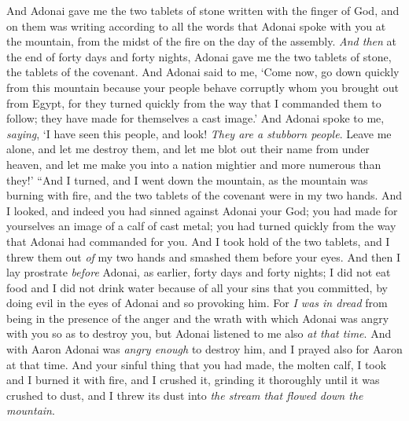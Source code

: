 \begin{biblechapter}
\verse And Adonai gave me the two tablets of stone written with the finger of God, and on them was writing according to all the words that Adonai spoke with you at the mountain, from the midst of the fire on the day of the assembly.
\verse \textit{And then} at the end of forty days and forty nights, Adonai gave me the two tablets of stone, the tablets of the covenant.
\verse And Adonai said to me, ‘Come now, go down quickly from this mountain because your people behave corruptly whom you brought out from Egypt, for they turned quickly from the way that I commanded them to follow; they have made for themselves a cast image.’
\verse And Adonai spoke to me, \textit{saying}, ‘I have seen this people, and look! \textit{They are a stubborn people}.
\verse Leave me alone, and let me destroy them, and let me blot out their name from under heaven, and let me make you into a nation mightier and more numerous than they!’
\verse “And I turned, and I went down the mountain, as the mountain was burning with fire, and the two tablets of the covenant were in my two hands.
\verse And I looked, and indeed you had sinned against Adonai your God; you had made for yourselves an image of a calf of cast metal;  you had turned quickly from the way that Adonai had commanded for you.
\verse And I took hold of the two tablets, and I threw them out \textit{of} my two hands and smashed them before your eyes.
\verse And then I lay prostrate \textit{before} Adonai, as earlier, forty days and forty nights; I did not eat food and I did not drink water because of all your sins that you committed, by doing evil in the eyes of Adonai and so provoking him.
\verse For \textit{I was in dread} from being in the presence of the anger and the wrath with which Adonai was angry with you so as to destroy you, but Adonai listened to me also \textit{at that time}.
\verse And with Aaron Adonai was \textit{angry enough} to destroy him, and I prayed also for Aaron at that time.
\verse And your sinful thing that you had made, the molten calf, I took and I burned it with fire, and I crushed it, grinding it thoroughly until it was crushed to dust, and I threw its dust into \textit{the stream that flowed down the mountain}.

\end{biblechapter}
